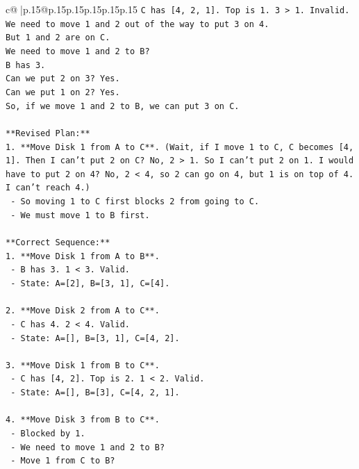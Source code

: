 \documentclass{article}
\begin{document}
{\begin{supertabular}{c@{$\;$}|p{.15\linewidth}@{}p{.15\linewidth}p{.15\linewidth}p{.15\linewidth}p{.15\linewidth}p{.15\linewidth}}
{{{\texttt{C has {[}4, 2, 1{]}. Top is 1. 3 > 1. Invalid.} \\
\texttt{We need to move 1 and 2 out of the way to put 3 on 4.} \\
\texttt{But 1 and 2 are on C.} \\
\texttt{We need to move 1 and 2 to B?} \\
\texttt{B has 3.} \\
\texttt{Can we put 2 on 3? Yes.} \\
\texttt{Can we put 1 on 2? Yes.} \\
\texttt{So, if we move 1 and 2 to B, we can put 3 on C.} \\
\\ 
\texttt{**Revised Plan:**} \\
\texttt{1. **Move Disk 1 from A to C**. (Wait, if I move 1 to C, C becomes {[}4, 1{]}. Then I can't put 2 on C? No, 2 > 1. So I can't put 2 on 1. I would have to put 2 on 4? No, 2 < 4, so 2 can go on 4, but 1 is on top of 4. I can't reach 4.)} \\
\texttt{   {-} So moving 1 to C first blocks 2 from going to C.} \\
\texttt{   {-} We must move 1 to B first.} \\
\\ 
\texttt{**Correct Sequence:**} \\
\texttt{1. **Move Disk 1 from A to B**.} \\
\texttt{   {-} B has 3. 1 < 3. Valid.} \\
\texttt{   {-} State: A={[}2{]}, B={[}3, 1{]}, C={[}4{]}.} \\
\\ 
\texttt{2. **Move Disk 2 from A to C**.} \\
\texttt{   {-} C has 4. 2 < 4. Valid.} \\
\texttt{   {-} State: A={[}{]}, B={[}3, 1{]}, C={[}4, 2{]}.} \\
\\ 
\texttt{3. **Move Disk 1 from B to C**.} \\
\texttt{   {-} C has {[}4, 2{]}. Top is 2. 1 < 2. Valid.} \\
\texttt{   {-} State: A={[}{]}, B={[}3{]}, C={[}4, 2, 1{]}.} \\
\\ 
\texttt{4. **Move Disk 3 from B to C**.} \\
\texttt{   {-} Blocked by 1.} \\
\texttt{   {-} We need to move 1 and 2 to B?} \\
\texttt{   {-} Move 1 from C to B?} \\
}}}
\end{supertabular}}
\end{document}
